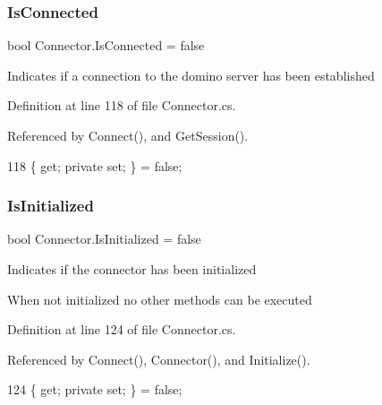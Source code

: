 \subsubsection{\texorpdfstring{Is\+Connected}{IsConnected}}
{\footnotesize\ttfamily bool Connector.\+Is\+Connected = false\hspace{0.3cm}{\ttfamily [get]}}



Indicates if a connection to the domino server has been established 



Definition at line 118 of file Connector.\+cs.



Referenced by Connect(), and Get\+Session().


\begin{DoxyCode}
118 \{ \textcolor{keyword}{get}; \textcolor{keyword}{private} \textcolor{keyword}{set}; \} = \textcolor{keyword}{false};
\end{DoxyCode}
\mbox{\label{class_connector_ae9cbe0b51d601dab13ba7271db4f3883}} 
\subsubsection{\texorpdfstring{Is\+Initialized}{IsInitialized}}
{\footnotesize\ttfamily bool Connector.\+Is\+Initialized = false\hspace{0.3cm}{\ttfamily [get]}}



Indicates if the connector has been initialized 

When not initialized no other methods can be executed

Definition at line 124 of file Connector.\+cs.



Referenced by Connect(), Connector(), and Initialize().


\begin{DoxyCode}
124 \{ \textcolor{keyword}{get}; \textcolor{keyword}{private} \textcolor{keyword}{set}; \} = \textcolor{keyword}{false};
\end{DoxyCode}
\mbox{\label{class_connector_a1ed422674b344524fd77998dcf6a9ba6}} 
